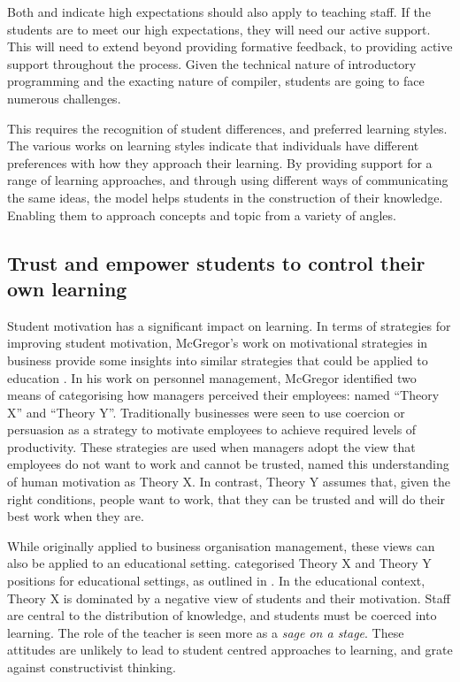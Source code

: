 Both \citet{Chickering:1987} and \citet{Soetanto:2003,Soetanto:2012} indicate high expectations should also apply to teaching staff. If the students are to meet our high expectations, they will need our active support. This will need to extend beyond providing formative feedback, to providing active support throughout the process. Given the technical nature of introductory programming and the exacting nature of compiler, students are going to face numerous challenges.

This requires the recognition of student differences, and preferred learning styles. The various works on learning styles \cite{Coffield:2004} indicate that individuals have different preferences with how they approach their learning. By providing support for a range of learning approaches, and through using different ways of communicating the same ideas, the model helps students in the construction of their knowledge. Enabling them to approach concepts and topic from a variety of angles.


\subsection{Trust and empower students to control their own learning} %
\label{ssub:trust_and_empower_students_to_control_their_own_learning}

%
%


Student motivation has a significant impact on learning. In terms of strategies for improving student motivation, McGregor's work on motivational strategies in business provide some insights into similar strategies that could be applied to education \cite{McGregor:1960}.  In his work on personnel management, McGregor identified two means of categorising how managers perceived their employees: named ``Theory X'' and ``Theory Y''. Traditionally businesses were seen to use coercion or persuasion as a strategy to motivate employees to achieve required levels of productivity. These strategies are used when managers adopt the view that employees do not want to work and cannot be trusted, \citet{McGregor:1960} named this understanding of human motivation as Theory X. In contrast, Theory Y assumes that, given the right conditions, people want to work, that they can be trusted and will do their best work when they are.

While originally applied to business organisation management, these views can also be applied to an educational setting. \citet{Markwell:2004} categorised Theory X and Theory Y positions for educational settings, as outlined in . In the educational context, Theory X is dominated by a negative view of students and their motivation. Staff are central to the distribution of knowledge, and students must be coerced into learning. The role of the teacher is seen more as a \emph{sage on a stage}. These attitudes are unlikely to lead to student centred approaches to learning, and grate against constructivist thinking.

